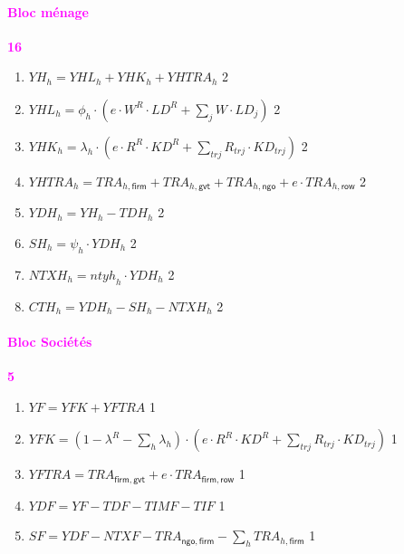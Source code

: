 \documentclass[11pt,a4paper]{article}
\newcommand{\firm}{\mathsf{firm}}
\newcommand{\gvt}{\mathsf{gvt}}
\newcommand{\ngo}{\mathsf{ngo}}
\newcommand{\ntyh}{\mathit{ntyh}}
\newcommand{\row}{\mathsf{row}}
\newcommand{\trj}{\mathit{trj}}
\newcommand{\CTH}{\mathit{CTH}}
\newcommand{\KD}{\mathit{KD}}
\newcommand{\LD}{\mathit{LD}}
\newcommand{\NTXF}{\mathit{NTXF}}
\newcommand{\NTXH}{\mathit{NTXH}}
\newcommand{\SF}{\mathit{SF}}
\newcommand{\SH}{\mathit{SH}}
\newcommand{\TDF}{\mathit{TDF}}
\newcommand{\TDH}{\mathit{TDH}}
\newcommand{\TIF}{\mathit{TIF}}
\newcommand{\TIMF}{\mathit{TIMF}}
\newcommand{\TRA}{\mathit{TRA}}
\newcommand{\YDF}{\mathit{YDF}}
\newcommand{\YDH}{\mathit{YDH}}
\newcommand{\YF}{\mathit{YF}}
\newcommand{\YFK}{\mathit{YFK}}
\newcommand{\YFTR}{\mathit{YFTRA}}
\newcommand{\YH}{\mathit{YH}}
\newcommand{\YHK}{\mathit{YHK}}
\newcommand{\YHL}{\mathit{YHL}}
\newcommand{\YHTR}{\mathit{YHTRA}}
\newcommand{\redparagraph}[1]{\paragraph*{\large\textcolor{Fuchsia}{#1}}}
\begin{document}
	\redparagraph{Bloc ménage}\hfill \textcolor{Fuchsia}{\textbf{16}}
	\begin{enumerate}[itemsep=2pt,label=\textbf{eq\arabic*}.,resume,ref=\textbf{eq\arabic*}]
		
		\item $\YH_h  =  \YHL_h + \YHK_h + \YHTR_h $ \hfill 2
		
		\item $\YHL_h = \phi_h \cdot\left(e\cdot W^R\cdot\LD^R + \sum_{j}^{}W\cdot \LD_j\right)$ \hfill 2
		
		\item $\YHK_h = \lambda_h\cdot\left(e\cdot R^R\cdot\KD^R + \sum_{\trj}^{} R_{\trj}\cdot\KD_{\trj}\right) $ \hfill 2
		
		\item $\YHTR_h = \TRA_{h,\firm} + \TRA_{h,\gvt} + \TRA_{h,\ngo} + e\cdot\TRA_{h,\row}$ \hfill 2
		
		\item $\YDH_h = \YH_h - \TDH_h$ \hfill 2
		
		\item $\SH_h = \psi_h\cdot\YDH_h$ \hfill 2
		
		\item $\NTXH_{h} = \ntyh_{h} \cdot\YDH_h$ \label{it:TRAGVTh} \hfill 2
		
		\item $\CTH_h = \YDH_h - \SH_h - \NTXH_{h}$  \hfill 2
		
	\end{enumerate}
	
	
	\redparagraph{Bloc Sociétés}\hfill \textcolor{Fuchsia}{\textbf{5}}
	\begin{enumerate}[itemsep=2pt,label=\textbf{eq\arabic*}.,resume, ref=\textbf{eq\arabic*}]	
			
		\item $\YF = \YFK + \YFTR$ \hfill 1
		
		\item $\YFK = \left(1 - \lambda^R-\sum_{h}\lambda_h\right)\cdot\left(e\cdot R^R\cdot\KD^R + \sum_{\trj}^{} R_{\trj}\cdot\KD_{\trj}\right)$ \hfill 1
		
		\item $\YFTR = \TRA_{\firm,\gvt}  + e\cdot\TRA_{\firm,\row} $ \hfill 1
		
		\item $\YDF = \YF  - \TDF - \TIMF -\TIF  $ \hfill 1
		
		\item $\SF = \YDF -  \NTXF  - \TRA_{\ngo,\firm} - \sum_{h}\TRA_{h,\firm}$ \hfill 1	
			
	\end{enumerate}
	
\end{document}

